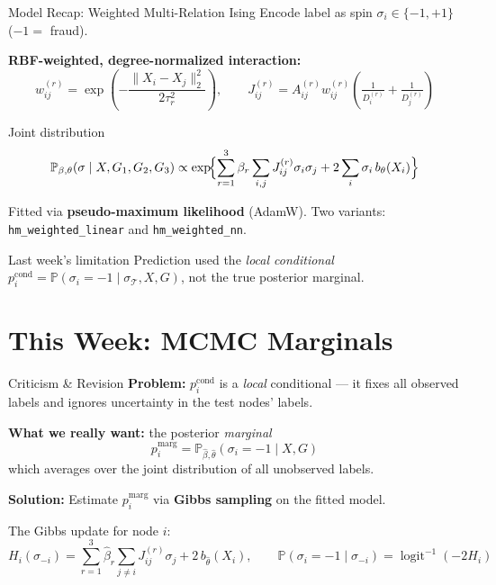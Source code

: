 \documentclass[10pt]{beamer}
\begin{document}
\begin{frame}{Model Recap: Weighted Multi-Relation Ising}
    Encode label as spin $\sigma_i \in \{-1,+1\}$ ($-1 = $ fraud).

    \vspace{0.3em}
    \textbf{RBF-weighted, degree-normalized interaction:}
    \[
        w_{ij}^{(r)} = \exp\!\left(-\frac{\|X_i-X_j\|_2^2}{2\tau_r^2}\right),
        \qquad
        J_{ij}^{(r)} = A_{ij}^{(r)} w_{ij}^{(r)}\!\left(\tfrac{1}{D_i^{(r)}}+\tfrac{1}{D_j^{(r)}}\right)
    \]

    \begin{block}{Joint distribution}
        \[
            \mathbb{P}_{\beta,\theta}(\sigma \mid X, G_1,G_2,G_3)
            \propto
            \exp\!\Bigl\{
              \sum_{r=1}^3 \beta_r \sum_{i,j} J_{ij}^{(r)}\sigma_i\sigma_j
              + 2\sum_i \sigma_i\, b_\theta(X_i)
            \Bigr\}
        \]
    \end{block}

    \vspace{0.2em}
    Fitted via \textbf{pseudo-maximum likelihood} (AdamW). Two variants:
    \texttt{hm\_weighted\_linear} and \texttt{hm\_weighted\_nn}.

    \vspace{0.3em}
    \begin{alertblock}{Last week's limitation}
        Prediction used the \emph{local conditional} $p_i^{\mathrm{cond}} = \mathbb{P}(\sigma_i=-1 \mid \sigma_{\mathcal{T}}, X, G)$, not the true posterior marginal.
    \end{alertblock}
\end{frame}

\section{This Week: MCMC Marginals}

\begin{frame}{Criticism \& Revision}
    \textbf{Problem:} $p_i^{\mathrm{cond}}$ is a \emph{local} conditional --- it fixes all observed labels and ignores uncertainty in the test nodes' labels.

    \vspace{0.5em}
    \textbf{What we really want:} the posterior \emph{marginal}
    \[
        p_i^{\mathrm{marg}}
        =
        \mathbb{P}_{\widehat\beta,\widehat\theta}(\sigma_i = -1 \mid X, G)
    \]
    which averages over the joint distribution of all unobserved labels.

    \vspace{0.5em}
    \textbf{Solution:} Estimate $p_i^{\mathrm{marg}}$ via \textbf{Gibbs sampling} on the fitted model.

    \vspace{0.4em}
    The Gibbs update for node $i$:
    \[
        H_i(\sigma_{-i})
        =
        \sum_{r=1}^3 \widehat\beta_r \sum_{j \ne i} J_{ij}^{(r)}\sigma_j
        + 2\,b_{\widehat\theta}(X_i),
        \qquad
        \mathbb{P}(\sigma_i=-1 \mid \sigma_{-i}) = \operatorname{logit}^{-1}(-2H_i)
    \]
\end{frame}
\end{document}
